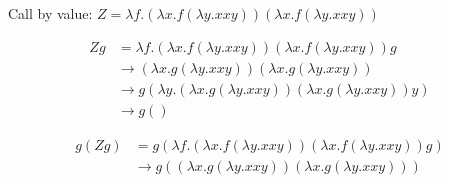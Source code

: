 \documentclass[a4paper, 11pt, article, danish, oneside]{memoir}
\newcommand{\step}{\to}
\begin{document}
Call by value: $Z = \lambda f . (\lambda x . f (\lambda y. x x y)) (\lambda x. f (\lambda y. x x y))$

\begin{align*}
    Z g
        &= \lambda f . (\lambda x . f (\lambda y. x x y)) (\lambda x. f (\lambda y. x x y)) g \\
        &\step (\lambda x . g (\lambda y. x x y)) (\lambda x. g (\lambda y. x x y)) \\
        &\step g (\lambda y. (\lambda x. g (\lambda y. x x y)) (\lambda x. g (\lambda y. x x y)) y) \\
        &\step g (  )
\end{align*}

\begin{align*}
    g (Z g)
        &= g (\lambda f . (\lambda x . f (\lambda y. x x y)) (\lambda x. f (\lambda y. x x y)) g) \\
        &\step g ((\lambda x . g (\lambda y. x x y)) (\lambda x. g (\lambda y. x x y)))
\end{align*}


\nocite{*}
\chapter*{\bibname}
\markboth{\bibname}{\bibname}
\printbibliography[heading=none]
\end{document}
